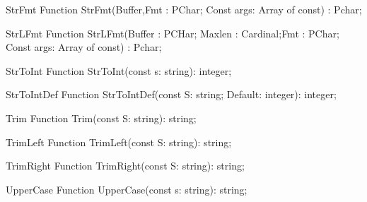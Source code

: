  
\begin{function}{StrFmt}
\Declaration
Function StrFmt(Buffer,Fmt : PChar; Const args: Array of const) : Pchar;
\Description
\Errors
\SeeAlso
\end{function}

 
\begin{function}{StrLFmt}
\Declaration
Function StrLFmt(Buffer : PCHar; Maxlen : Cardinal;Fmt : PChar; Const args: Array of const) : Pchar;
\Description
\Errors
\SeeAlso
\end{function}

 
\begin{function}{StrToInt}
\Declaration
Function StrToInt(const s: string): integer;
\Description
\Errors
\SeeAlso
\end{function}

 
\begin{function}{StrToIntDef}
\Declaration
Function StrToIntDef(const S: string; Default: integer): integer;
\Description
\Errors
\SeeAlso
\end{function}

 
\begin{function}{Trim}
\Declaration
Function Trim(const S: string): string;
\Description
\Errors
\SeeAlso
\end{function}

 
\begin{function}{TrimLeft}
\Declaration
Function TrimLeft(const S: string): string;
\Description
\Errors
\SeeAlso
\end{function}

 
\begin{function}{TrimRight}
\Declaration
Function TrimRight(const S: string): string;
\Description
\Errors
\SeeAlso
\end{function}

 
\begin{function}{UpperCase}
\Declaration
Function UpperCase(const s: string): string;
\Description
\Errors
\SeeAlso
\end{function}

 

